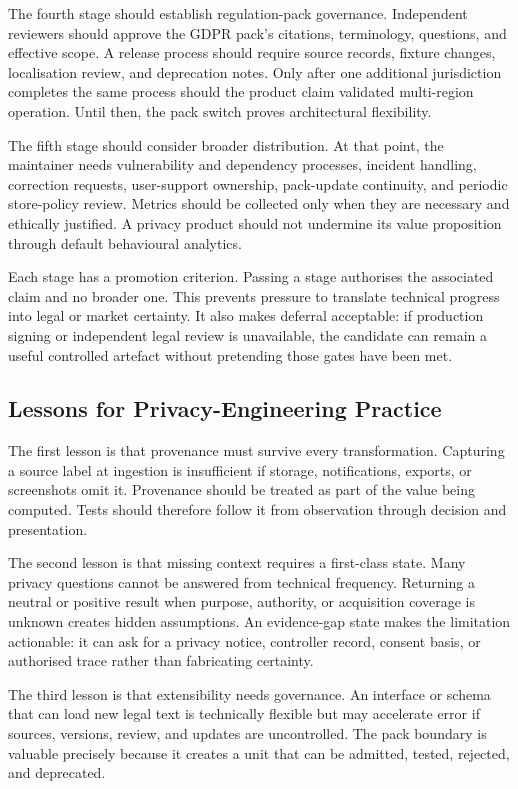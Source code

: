 The fourth stage should establish regulation-pack governance. Independent reviewers should approve the GDPR pack's citations, terminology, questions, and effective scope. A release process should require source records, fixture changes, localisation review, and deprecation notes. Only after one additional jurisdiction completes the same process should the product claim validated multi-region operation. Until then, the pack switch proves architectural flexibility.

The fifth stage should consider broader distribution. At that point, the maintainer needs vulnerability and dependency processes, incident handling, correction requests, user-support ownership, pack-update continuity, and periodic store-policy review. Metrics should be collected only when they are necessary and ethically justified. A privacy product should not undermine its value proposition through default behavioural analytics.

Each stage has a promotion criterion. Passing a stage authorises the associated claim and no broader one. This prevents pressure to translate technical progress into legal or market certainty. It also makes deferral acceptable: if production signing or independent legal review is unavailable, the candidate can remain a useful controlled artefact without pretending those gates have been met.

\subsection{Lessons for Privacy-Engineering Practice}

The first lesson is that provenance must survive every transformation. Capturing a source label at ingestion is insufficient if storage, notifications, exports, or screenshots omit it. Provenance should be treated as part of the value being computed. Tests should therefore follow it from observation through decision and presentation.

The second lesson is that missing context requires a first-class state. Many privacy questions cannot be answered from technical frequency. Returning a neutral or positive result when purpose, authority, or acquisition coverage is unknown creates hidden assumptions. An evidence-gap state makes the limitation actionable: it can ask for a privacy notice, controller record, consent basis, or authorised trace rather than fabricating certainty.

The third lesson is that extensibility needs governance. An interface or schema that can load new legal text is technically flexible but may accelerate error if sources, versions, review, and updates are uncontrolled. The pack boundary is valuable precisely because it creates a unit that can be admitted, tested, rejected, and deprecated.

